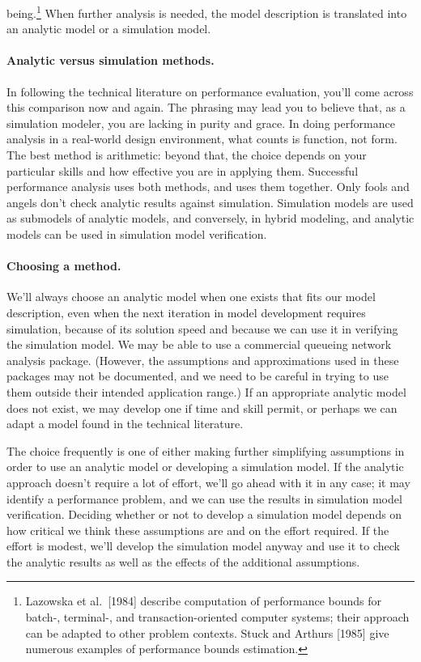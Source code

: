 \noindent being.\footnote{Lazowska
et al.\ [1984] describe computation of performance bounds for batch-, terminal-,
and transaction-oriented computer systems; their approach can be adapted to
other problem contexts. Stuck and Arthurs [1985] give numerous examples of
performance bounds estimation.} When further analysis is needed, the model
description is translated into an analytic model or a simulation model.

\paragraph{Analytic versus simulation methods.}
In following the technical literature on performance evaluation, you'll come
across this comparison now and again. The phrasing may lead you to believe
that, as a simulation modeler, you are lacking in purity and grace. In doing
performance analysis in a real-world design environment, what counts is
function, not form. The best method is arithmetic: beyond that, the choice
depends on your particular skills and how effective you are in applying them.
Successful performance analysis uses both methods, and uses them together.
Only fools and angels don't check analytic results against simulation.
Simulation models are used as submodels of analytic models, and conversely, in
hybrid modeling, and analytic models can be used in simulation model
verification.

\paragraph{Choosing a method.}
We'll always choose an analytic model when one exists that fits our model
description, even when the next iteration in model development requires
simulation, because of its solution speed and because we can use it in
verifying the simulation model. We may be able to use a commercial queueing
network analysis package. (However, the assumptions and approximations used
in these packages may not be documented, and we need to be careful in trying
to use them outside their intended application range.) If an appropriate
analytic model does not exist, we may develop one if time and skill permit, or
perhaps we can adapt a model found in the technical literature.

The choice frequently is one of either making further simplifying assumptions
in order to use an analytic model or developing a simulation model. If the
analytic approach doesn't require a lot of effort, we'll go ahead with it in
any case; it may identify a performance problem, and we can use the results in
simulation model verification. Deciding whether or not to develop a simulation
model depends on how critical we think these assumptions are and on the effort
required. If the effort is modest, we'll develop the simulation model anyway
and use it to check the analytic results as well as the effects of the
additional assumptions.

